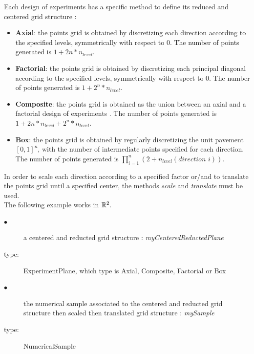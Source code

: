 Each design of experiments  has a specific method to define its reduced and centered grid structure :
\begin{itemize}
\item {\bf Axial}: the  points grid is obtained by discretizing each direction according to the specified levels, symmetrically with respect to 0. The number of points generated is $1 + 2n* n_{level}$.
\item {\bf Factorial}: the  points grid is obtained by discretizing each principal diagonal according to the specified levels, symmetrically with respect to 0. The number of points generated is $1 +  2^n*n_{level}$.
\item {\bf Composite}: the  points grid is obtained as the union between an axial and a factorial design of experiments . The number of points generated is $1 + 2n*n_{level} +  2^n*n_{level}$.
\item {\bf Box}: the  points grid is obtained by regularly discretizing the unit pavement $[0, 1]^n$, with the number of intermediate points specified for each direction.  The number of points generated is $\displaystyle \prod_{i=1}^{n} (2+n_{level}(direction \, \, i))$.
\end{itemize}

In order to scale each direction according to a specified factor or/and to translate the points grid until a specified center, the methods {\itshape scale} and {\itshape translate} must be used.\\

The following example works in ${\mathbb R}^2$.\\

             {
               \begin{description}
               \item[$\bullet$] a centered and reducted grid structure : {\itshape myCenteredReductedPlane}
               \item[type:] ExperimentPlane, which type is Axial, Composite, Factorial or Box
               \item[$\bullet$] the numerical sample associated to the centered and reducted grid structure then scaled then translated grid structure : {\itshape mySample}
               \item[type:] NumericalSample
               \end{description}
             }

